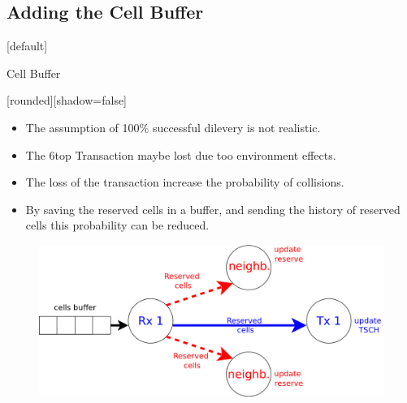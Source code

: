 \documentclass{beamer}
\makeatletter
\newenvironment{withoutheadline}{
        \setbeamertemplate{headline}[default]
        \def\beamer@entrycode{\vspace*{-\headheight}}
    }{}
\makeatother
\begin{document}
\subsection{Adding the Cell Buffer}

\begin{withoutheadline}
\begin{frame}{Cell Buffer}


[rounded][shadow=false]


\begin{block}

    \begin{itemize}
    \item The assumption of 100\% successful dilevery is not realistic.
    \item The 6top Transaction maybe lost due too environment effects. 
    \item The loss of the transaction increase the probability of collisions. 
    \item By saving the reserved cells in a buffer, and sending the history of reserved cells this probability can be reduced.
     
    
    \end{itemize}
    \end{block}

\centering
\begin{figure}[p]

\includegraphics[width=0.7\linewidth]{reserve2.png}
\end{figure}

\end{frame}
\end{withoutheadline}
\end{document}
